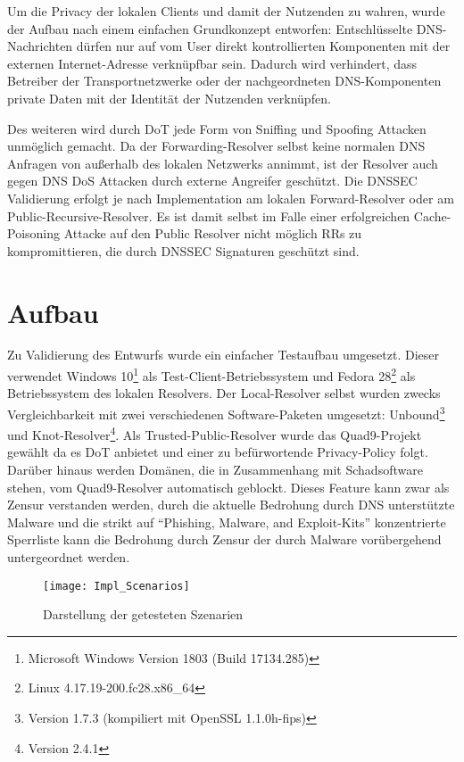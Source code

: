 Um die Privacy der lokalen Clients und damit der Nutzenden zu wahren, wurde der Aufbau nach einem einfachen Grundkonzept entworfen: Entschlüsselte DNS-Nachrichten dürfen nur auf vom User direkt kontrollierten Komponenten mit der externen Internet-Adresse verknüpfbar sein. Dadurch wird verhindert, dass Betreiber der Transportnetzwerke oder der nachgeordneten DNS-Komponenten private Daten mit der Identität der Nutzenden verknüpfen.

Des weiteren wird durch DoT jede Form von Sniffing und Spoofing Attacken unmöglich gemacht. Da der Forwarding-Resolver selbst keine normalen DNS Anfragen von außerhalb des lokalen Netzwerks annimmt, ist der Resolver auch gegen DNS DoS Attacken durch externe Angreifer geschützt. Die DNSSEC Validierung erfolgt je nach Implementation am lokalen Forward-Resolver oder am Public-Recursive-Resolver. Es ist damit selbst im Falle einer erfolgreichen Cache-Poisoning Attacke auf den Public Resolver nicht möglich RRs zu kompromittieren, die durch DNSSEC Signaturen geschützt sind.

\section{Aufbau}
\label{sec:architecture}
Zu Validierung des Entwurfs wurde ein einfacher Testaufbau umgesetzt. Dieser verwendet Windows 10\footnote{Microsoft Windows Version 1803 (Build 17134.285)} als Test-Client-Betriebssystem und Fedora 28\footnote{Linux 4.17.19-200.fc28.x86\_64} als Betriebssystem des lokalen Resolvers. Der Local-Resolver selbst wurden zwecks Vergleichbarkeit mit zwei verschiedenen Software-Paketen umgesetzt: Unbound\footnote{Version 1.7.3 (kompiliert mit OpenSSL 1.1.0h-fips)} und Knot-Resolver\footnote{Version 2.4.1}. Als Trusted-Public-Resolver wurde das Quad9-Projekt gewählt da es DoT anbietet und einer zu befürwortende Privacy-Policy\cite{Quad9Privacy} folgt. Darüber hinaus werden Domänen, die in Zusammenhang mit Schadsoftware stehen, vom Quad9-Resolver automatisch geblockt. Dieses Feature kann zwar als Zensur verstanden werden, durch die aktuelle Bedrohung durch DNS unterstützte Malware \cite{Alcoy2017} und die strikt auf ``Phishing, Malware, and Exploit-Kits'' konzentrierte Sperrliste\cite{Quad9FAQ} kann die Bedrohung durch Zensur der durch Malware vorübergehend untergeordnet werden.   
\begin{wrapfigure}{r}{0.5\textwidth}
    \begin{center}
    \texttt{[image: Impl\_Scenarios]}
    \end{center}
    \caption{Darstellung der getesteten Szenarien}
    \label{img:impl-scenarios}
\end{wrapfigure}

